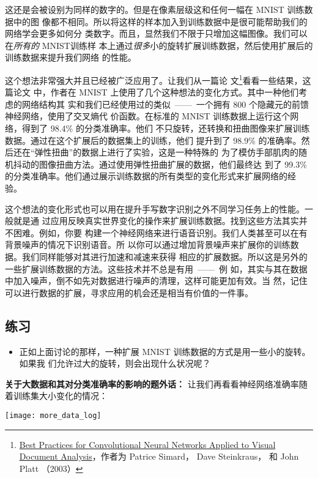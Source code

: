 这还是会被设别为同样的数字的。但是在像素层级这和任何一幅在 MNIST 训练数据中的图
像都不相同。所以将这样的样本加入到训练数据中是很可能帮助我们的网络学会更多如何分
类数字。而且，显然我们不限于只增加这幅图像。我们可以在\emph{所有的} MNIST训练样
本上通过\emph{很多}小的旋转扩展训练数据，然后使用扩展后的训练数据来提升我们网络
的性能。

这个想法非常强大并且已经被广泛应用了。让我们从一篇论
文\footnote{\href{http://dx.doi.org/10.1109/ICDAR.2003.1227801}{Best Practices
    for Convolutional Neural Networks Applied to Visual Document Analysis}，作者为
  Patrice Simard， Dave Steinkraus， 和 John Platt （2003）}看看一些结果，这篇论文
中，作者在 MNIST 上使用了几个这种想法的变化方式。其中一种他们考虑的网络结构其
实和我们已经使用过的类似~——~一个拥有 800 个隐藏元的前馈神经网络，使用了交叉熵代
价函数。在标准的 MNIST 训练数据上运行这个网络，得到了 98.4\% 的分类准确率。他们
不只旋转，还转换和扭曲图像来扩展训练数据。通过在这个扩展后的数据集上的训练，他们
提升到了 98.9\% 的准确率。然后还在“弹性扭曲”的数据上进行了实验，这是一种特殊的
为了模仿手部肌肉的随机抖动的图像扭曲方法。通过使用弹性扭曲扩展的数据，他们最终达
到了 99.3\% 的分类准确率。他们通过展示训练数据的所有类型的变化形式来扩展网络的经
验。

这个想法的变化形式也可以用在提升手写数字识别之外不同学习任务上的性能。一般就是通
过应用反映真实世界变化的操作来扩展训练数据。找到这些方法其实并不困难。例如，你要
构建一个神经网络来进行语音识别。我们人类甚至可以在有背景噪声的情况下识别语音。所
以你可以通过增加背景噪声来扩展你的训练数据。我们同样能够对其进行加速和减速来获得
相应的扩展数据。所以这是另外的一些扩展训练数据的方法。这些技术并不总是有用~——~例
如，其实与其在数据中加入噪声，倒不如先对数据进行噪声的清理，这样可能更加有效。当
然，记住可以进行数据的扩展，寻求应用的机会还是相当有价值的一件事。

\subsection*{练习}

\begin{itemize}
\item 正如上面讨论的那样，一种扩展 MNIST 训练数据的方式是用一些小的旋转。如果我
  们允许过大的旋转，则会出现什么状况呢？
\end{itemize}

\textbf{关于大数据和其对分类准确率的影响的题外话：} 让我们再看看神经网络准确率随
着训练集大小变化的情况：
\begin{center}
\texttt{[image: more\_data\_log]}
\end{center}

